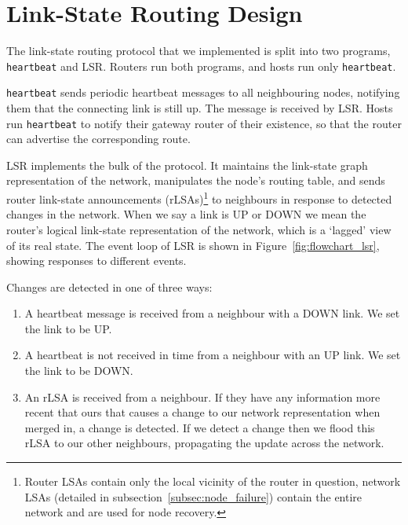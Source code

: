 \documentclass[withindex,glossary,openany]{cam-thesis}
\begin{document}
\section{Link-State Routing Design}
\label{sec:lsr_design}

The link-state routing protocol that we implemented is split into two programs, \texttt{heartbeat} and LSR.  Routers run both programs, and hosts run only \texttt{heartbeat}.

\texttt{heartbeat} sends periodic heartbeat messages to all neighbouring nodes, notifying them that the connecting link is still up. The message is received by LSR. Hosts run \texttt{heartbeat} to notify their gateway router of their existence, so that the router can advertise the corresponding route.

LSR implements the bulk of the protocol. It maintains the link-state graph representation of the network, manipulates the node's routing table, and sends router link-state announcements (rLSAs)\footnote{Router LSAs contain only the local vicinity of the router in question, network LSAs (detailed in subsection~\ref{subsec:node_failure}) contain the entire network and are used for node recovery.} to neighbours in response to detected changes in the network. When we say a link is UP or DOWN we mean the router's logical link-state representation of the network, which is a `lagged' view of its real state. The event loop of LSR is shown in Figure~\ref{fig:flowchart_lsr}, showing responses to different events.

Changes are detected in one of three ways:
\begin{enumerate}
	\item
	A heartbeat message is received from a neighbour with a DOWN link. We set the link to be UP.
	
	\item
	A heartbeat is not received in time from a neighbour with an UP link. We set the link to be DOWN.
	
	\item
	An rLSA is received from a neighbour. If they have any information more recent that ours that causes a change to our network representation when merged in, a change is detected. If we detect a change then we flood this rLSA to our other neighbours, propagating the update across the network.
\end{enumerate}
\end{document}
